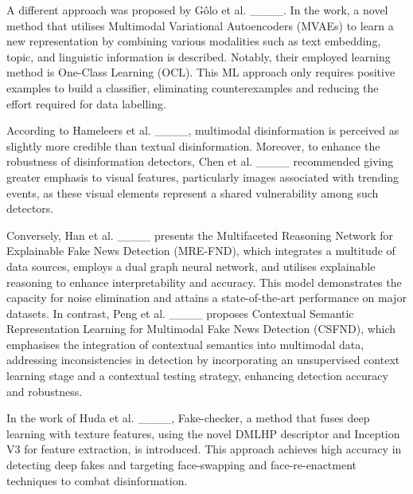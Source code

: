 A different approach was proposed by Gôlo et al. ____. In the work, a novel method that utilises Multimodal Variational Autoencoders (MVAEs) to learn a new representation by combining various modalities such as text embedding, topic, and linguistic information is described. Notably, their employed learning method is One-Class Learning (OCL). This ML approach only requires positive examples to build a classifier, eliminating counterexamples and reducing the effort required for data labelling.

According to Hameleers et al. ____, multimodal disinformation is perceived as slightly more credible than textual disinformation. Moreover, to enhance the robustness of disinformation detectors, Chen et al. ____ recommended giving greater emphasis to visual features, particularly images associated with trending events, as these visual elements represent a shared vulnerability among such detectors.

Conversely, Han et al. ____ presents the Multifaceted Reasoning Network for Explainable Fake News Detection (MRE-FND), which integrates a multitude of data sources, employs a dual graph neural network, and utilises explainable reasoning to enhance interpretability and accuracy. This model demonstrates the capacity for noise elimination and attains a state-of-the-art performance on major datasets. In contrast, Peng et al. ____ proposes Contextual Semantic Representation Learning for Multimodal Fake News Detection (CSFND), which emphasises the integration of contextual semantics into multimodal data, addressing inconsistencies in detection by incorporating an unsupervised context learning stage and a contextual testing strategy, enhancing detection accuracy and robustness.

In the work of Huda et al. ____, Fake-checker, a method that fuses deep learning with texture features, using the novel DMLHP descriptor and Inception V3 for feature extraction, is introduced. This approach achieves high accuracy in detecting deep fakes and targeting face-swapping and face-re-enactment techniques to combat disinformation.